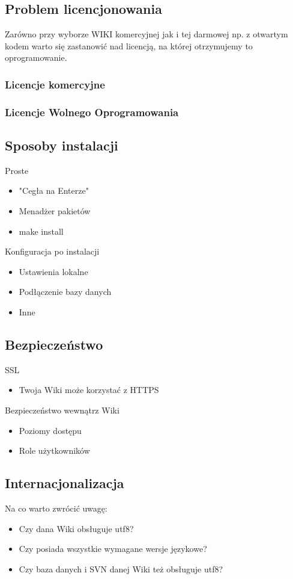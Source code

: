\documentclass{article}
\begin{document}
	\subsection{Problem licencjonowania}
	Zarówno przy wyborze WIKI komercyjnej jak i tej darmowej np. z otwartym kodem warto się zastanowić nad licencją, na której otrzymujemy to oprogramowanie.
	\subsubsection{Licencje komercyjne}
	\subsubsection{Licencje Wolnego Oprogramowania}
	\subsection{Sposoby instalacji}
		Proste
		\begin{itemize}
			\item "Cegła na Enterze"
			\item Menadżer pakietów
			\item make install
		\end{itemize}
		Konfiguracja po instalacji
		\begin{itemize}
			\item Ustawienia lokalne
			\item Podłączenie bazy danych
			\item Inne
		\end{itemize}
	\subsection{Bezpieczeństwo}
		SSL
		\begin{itemize}
			\item Twoja Wiki może korzystać z HTTPS
		\end{itemize}
		Bezpieczeństwo wewnątrz Wiki
		\begin{itemize}
			\item Poziomy dostępu
			\item Role użytkowników
		\end{itemize}
	\subsection{Internacjonalizacja}
		Na co warto zwrócić uwagę:
		\begin{itemize}
			\item Czy dana Wiki obsługuje utf8?
			\item Czy posiada wszystkie wymagane wersje językowe?
			\item Czy baza danych i SVN danej Wiki też obsługuje utf8?
		\end{itemize}
			
\end{document}
